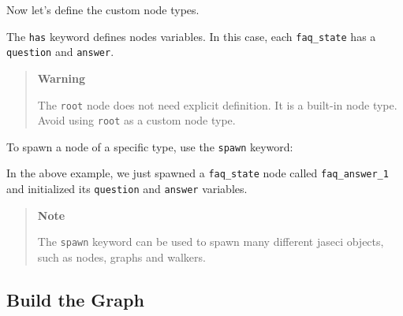 Now let's define the custom node types.

\begin{Shaded}
    \begin{Highlighting}[]
        \OperatorTok{;}
        \OperatorTok{\{}
        \OperatorTok{;}
        \OperatorTok{;}
        \OperatorTok{\}}
    \end{Highlighting}
\end{Shaded}

The \texttt{has} keyword defines nodes variables. In this case, each
\texttt{faq\_state} has a \texttt{question} and \texttt{answer}.

\begin{quote}
    \textbf{Warning}

    The \texttt{root} node does not need explicit definition. It is a
    built-in node type. Avoid using \texttt{root} as a custom node type.
\end{quote}

To spawn a node of a specific type, use the \texttt{spawn} keyword:

\begin{Shaded}
    \begin{Highlighting}[]
        \OperatorTok{=}\OperatorTok{::}\NormalTok{(}
        \OperatorTok{=}\OperatorTok{,}
        \OperatorTok{=}\OperatorTok{,}
        \NormalTok{)}\OperatorTok{;}
    \end{Highlighting}
\end{Shaded}

In the above example, we just spawned a \texttt{faq\_state} node called
\texttt{faq\_answer\_1} and initialized its \texttt{question} and
\texttt{answer} variables.

\begin{quote}
    \textbf{Note}

    The \texttt{spawn} keyword can be used to spawn many different jaseci
    objects, such as nodes, graphs and walkers.
\end{quote}

\subsection{Build the Graph}\label{build-the-graph}

